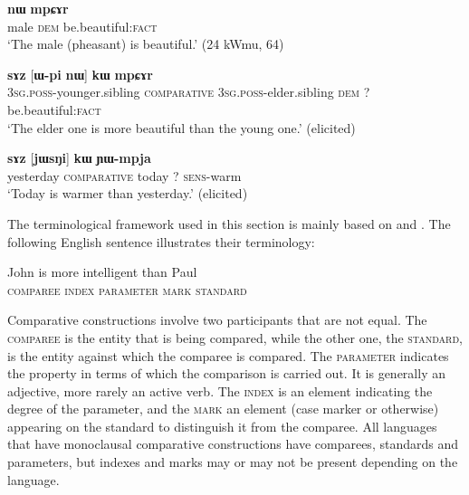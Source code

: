 \documentclass[oldfontcommands,oneside,a4paper,11pt]{article}
\newcommand{\ipa}[1]{{\phon\textbf{#1}}}
\begin{document}
\begin{exe}
\ex \label{ex:simple}
\gll  \ipa{pʰu}   	\ipa{nɯ}   \ipa{mpɕɤr}     \\
  male \textsc{dem}    be.beautiful:\textsc{fact} \\
\glt `The male (pheasant) is beautiful.' (24 kWmu, 64)
\end{exe}

\begin{exe}
\ex \label{ex:comp1}
\gll  \ipa{ɯ-ʁi}   	\ipa{sɤz}   	[\ipa{ɯ-pi}   	\ipa{nɯ}]   	\ipa{\textbf{kɯ}}   	\ipa{mpɕɤr}     \\
\textsc{3sg.poss}-younger.sibling \textsc{comparative} \textsc{3sg.poss}-elder.sibling \textsc{dem} ?{ }  be.beautiful:\textsc{fact} \\
\glt `The elder one is more beautiful than the young one.' (elicited)
\end{exe}
 
 
\begin{exe}
\ex \label{ex:comparative.complete}
\gll \ipa{jɯfɕɯr}   	\ipa{sɤz }   	[\ipa{jɯsŋi}]   	\ipa{kɯ}   	\ipa{ɲɯ-mpja}   \\
yesterday \textsc{comparative} today ? \textsc{sens}-warm \\
\glt `Today is warmer than yesterday.' (elicited)
\end{exe}

The terminological framework used in this section is mainly based on \citet{dixon08comparative} and \citet{stassen11comparative}. The following English sentence   illustrates their  terminology:

\begin{exe}
\ex \label{ex:comp.eng}
\gll  John is more intelligent than Paul \\
\textsc{comparee} { } \textsc{index} \textsc{parameter} \textsc{mark} \textsc{standard}  \\
\end{exe}

Comparative constructions involve two participants that are not equal. The \textsc{comparee} is  the entity that is being compared, while the other one, the \textsc{standard}, is the entity against which the comparee is compared. The \textsc{parameter} indicates the property in terms of which the comparison is carried out. It is generally an adjective, more rarely an active verb. The \textsc{index} is an element indicating the degree of the parameter, and the \textsc{mark} an element (case marker or otherwise) appearing on the standard to distinguish it from the comparee. All languages that have monoclausal comparative constructions have comparees, standards and parameters, but indexes and marks may or may not be present depending on the language.
\end{document}
